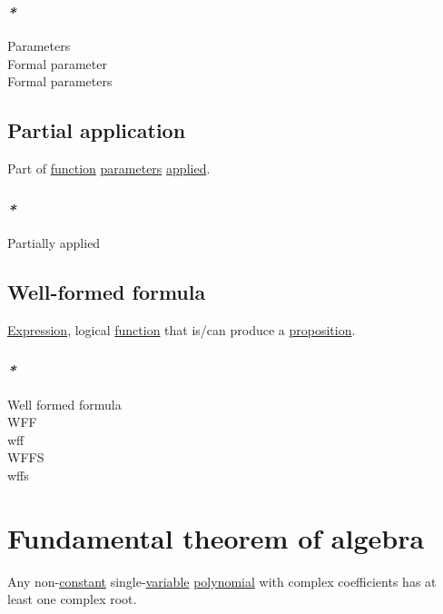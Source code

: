 \documentclass[a4paper,14pt,oneside]{book}
\begin{document}
\subsection{\emph{*}}
\label{sec:org6e7c25c}

\label{orgf6e4038}Parameters\\
\label{org3d67a94}Formal parameter\\
\label{orgd98a9fe}Formal parameters\\

\section{\label{org2b3f894}Partial application}
\label{sec:org41e25ef}
Part of \hyperref[orge00b05b]{function} \hyperref[orgf6e4038]{parameters} \hyperref[org8d2ef81]{applied}.\\

\subsection{\emph{*}}
\label{sec:org3af040f}

\label{org908c3b4}Partially applied\\

\section{\label{orgbef03e4}Well-formed formula}
\label{sec:orgb9b2c76}
\hyperref[org3ea9088]{Expression}, logical \hyperref[orge00b05b]{function} that is/can produce a \hyperref[orgb180614]{proposition}.\\

\subsection{\emph{*}}
\label{sec:org7cab05d}
\label{orgc17fad8}Well formed formula\\
\label{org96098d8}WFF\\
\label{org56aebd6}wff\\
\label{org93acbb4}WFFS\\
\label{orgce66516}wffs\\

\chapter{\label{org518168a}Fundamental theorem of algebra}
\label{sec:orge01662a}
Any non-\hyperref[orgbbfc5d8]{constant} single-\hyperref[orgd43afbd]{variable} \hyperref[orgb828406]{polynomial} with complex coefficients has at least one complex root.\\
\end{document}
